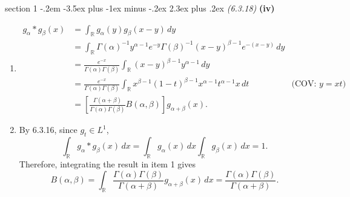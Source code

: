 \documentclass[12pt]{article}
\makeatletter
\theoremstyle{norm}
\newcommand{\R}[0]{\mathbb{R}}
\newcommand{\al}[0]{\alpha}
\newcommand{\be}[0]{\beta}
\newcommand{\Ga}[0]{\Gamma}
\newcommand{\ba}[1]{\left[ {#1} \right]}
\newcommand{\subprob}[1]{\noindent\textbf{#1}\\}
\newcommand{\ir}[0]{\int_{\R}}
\newcommand{\fc}[2]{\frac{#1}{#2}}
\newenvironment{problem}{\@startsection
       {section}
       {1}
       {-.2em}
       {-3.5ex plus -1ex minus -.2ex}
       {2.3ex plus .2ex}
       {\pagebreak[3]%
       \large\bf\noindent{Problem }
       }
       }
       {%
       }
\makeatother
\begin{document}
\begin{problem}{\it (6.3.18)}
\subprob{(iv)}
\begin{enumerate}
\item
\begin{align*}
g_{\al}*g_{\be}(x)&=
\int_{\R}g_{\al}(y)g_{\be}(x-y)\,dy\\
&=\ir \Ga(\al)^{-1}y^{\al-1}e^{-y}\Ga(\be)^{-1}(x-y)^{\be-1}e^{-(x-y)}\,dy\\
&=\frac{e^{-x}}{\Ga(\al)\Ga(\be)}\ir(x-y)^{\be-1} y^{\al-1}\,dy\\
&=\frac{e^{-x}}{\Ga(\al)\Ga(\be)}\ir x^{\be-1}(1-t)^{\be-1}x^{\al-1} t^{\al-1}x\,dt&\text{(COV: }y=xt)\\
&=\ba{\frac{\Ga(\al+\be)}{\Ga(\al)\Ga(\be)}B(\al,\be)}g_{\al+\be}(x).
\end{align*}
\item
By 6.3.16, since $g_t\in L^1$,
\[
\int_{\R} g_{\al}*g_{\be}(x)\,dx=\int_{\R}g_{\al}(x)\,dx\int_{\R}g_{\be}(x)\,dx=1.
\]
Therefore, integrating the result in item 1 gives
\[
B(\al,\be)=\ir\frac{\Ga(\al)\Ga(\be)}{\Ga(\al+\be)}g_{\al+\be}(x)\,dx=\fc{\Ga(\al)\Ga(\be)}{\Ga(\al+\be)}.
\]
\end{enumerate}
\end{problem}
\end{document}
